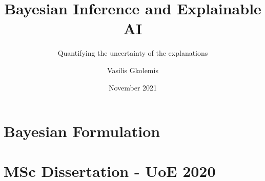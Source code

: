 \documentclass{beamer}
\title[FUB-Presentation]{Bayesian Inference and Explainable AI}
\subtitle{Quantifying the uncertainty of the explanations}
\author[Gkolemis, Vasilis] %
{Vasilis Gkolemis\inst{1}}
\institute[VFU] %
{
  \inst{1}%
  ATHENA Research and Innovation Center
}
\date{November 2021}
\begin{document}
\frame{\titlepage}



\section{Bayesian Formulation}


\section{MSc Dissertation - UoE 2020}


% 
\end{document}
